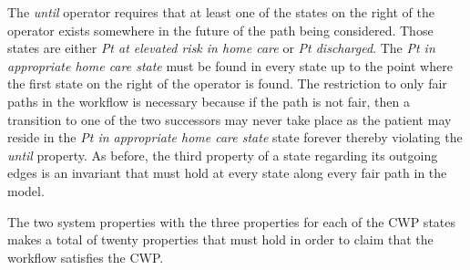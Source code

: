 The \emph{until} operator requires that at least one of the states on the right of the operator exists somewhere in the future of the path being considered. Those states are either \emph{Pt at elevated risk in home care} or \emph{Pt discharged}. The \emph{Pt in appropriate home care state} must be found in every state up to the point where the first state on the right of the operator is found. The restriction to only fair paths in the workflow is necessary because if the path is not fair, then a transition to one of the two successors may never take place as the patient may reside in the \emph{Pt in appropriate home care state} state forever thereby violating the \emph{until} property. As before, the third property of a state regarding its outgoing edges is an invariant that must hold at every state along every fair path in the model. 

The two system properties with the three properties for each of the CWP states makes a total of twenty properties that must hold in order to claim that the workflow satisfies the CWP.